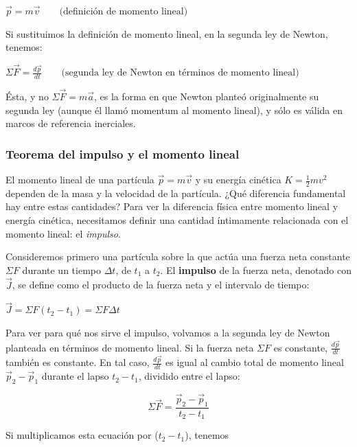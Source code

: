 \documentclass{article}
\newcommand{\newtitle}[1]{
    \color{titleColor}
    \subsubsection{#1}
    \color{black}
}
\newcommand{\bl}[1]{\textbf{#1}}
\newcommand{\definicion}[1]{%
    \vspace{0.5cm}
    \begin{definicionbox}
        #1
    \end{definicionbox}
    \vspace{0.5cm}
}
\begin{document}
    \definicion{
        \centering
        \( \vec{p} = m \vec{v} \quad \quad \text{(deﬁnición de momento lineal)} \)
    }

    \par Si sustituimos  la deﬁnición de momento lineal, en la segunda ley de Newton, tenemos:

    \definicion{
        \centering
        \( \Sigma \vec{F} = \frac{d \vec{p}}{dt} \quad \quad \text{(segunda ley de Newton en términos de momento lineal)} \)
    }

    \par Ésta, y no $\Sigma \vec{F} = m \vec{a}$, es la forma en que Newton planteó originalmente su segunda ley (aunque él llamó momentum al momento lineal), y sólo es válida en marcos de referencia inerciales.

    \newtitle{Teorema del impulso y el momento lineal}

    \par El momento lineal de una partícula $\vec{p} = m \vec{v}$ y su energía cinética $K = \frac{1}{2}mv^2$ dependen de la masa y la velocidad de la partícula. ¿Qué diferencia fundamental hay entre estas cantidades? Para ver la diferencia física entre momento lineal y energía cinética, necesitamos deﬁnir una cantidad íntimamente relacionada con el momento lineal: el \textit{impulso}.

    \par Consideremos primero una partícula sobre la que actúa una fuerza neta constante $\Sigma F$ durante un tiempo $\Delta t$, de $t_1$ a $t_2$. El \bl{impulso} de la fuerza neta, denotado con $\vec{J}$, se deﬁne como el producto de la fuerza neta y el intervalo de tiempo:

    \definicion{
        \centering
        \( \vec{J} = \Sigma F (t_2 - t_1) = \Sigma F \Delta t \)
    }

    \par Para ver para qué nos sirve el impulso, volvamos a la segunda ley de Newton planteada en términos de momento lineal. Si la fuerza neta $\Sigma F$ es constante, $\frac{d \vec{p}}{dt}$ también es constante. En tal caso, $\frac{d \vec{p}}{dt}$ es igual al cambio total de momento lineal $\vec{p}_2 - \vec{p}_1$ durante el lapso $t_2 - t_1$, dividido entre el lapso:

    \[ \Sigma \vec{F} = \frac{\vec{p}_2 - \vec{p}_1}{t_2 - t_1} \]

    \par Si multiplicamos esta ecuación por ($t_2 - t_1$), tenemos
\end{document}
